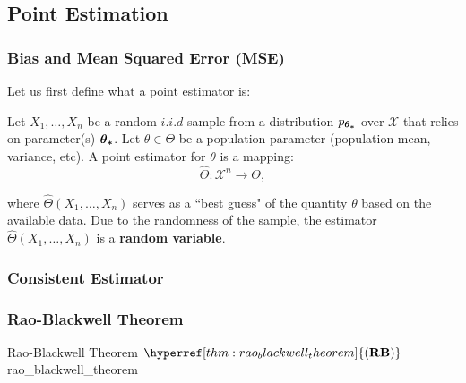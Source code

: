\subsection{Point Estimation}
\newcommand{\RB}{\hyperref[thm:rao_blackwell_theorem]{(\mathrm{{\bf RB}})}}
\newcommand{\CRLB}{\hyperref[thm:cramer_rao_lowerbound]{(\mathrm{{\bf CRLB}})}}

\subsubsection{Bias and Mean Squared Error (MSE)} 
Let us first define what a point estimator is:
\begin{definition}
    Let $X_1, \dots, X_n$ be a random $i.i.d$ sample from a distribution $p_{\boldsymbol{\theta_*}}$ over $\mathcal{X}$ that relies on parameter(s) $\boldsymbol{\theta_*}$. Let $\theta\in\Theta$ be a population parameter (population mean, variance, etc). A point estimator for $\theta$ is a mapping:
    \begin{equation}
        \widehat{\Theta}: \mathcal{X}^n \to \Theta,
    \end{equation}

    \noindent where $\widehat{\Theta}(X_1, \dots, X_n)$ serves as a ``best guess" of the quantity $\theta$ based on the available data. Due to the randomness of the sample, the estimator $\widehat\Theta(X_1, \dots, X_n)$ is a \textbf{random variable}.
\end{definition} 

\subsubsection{Consistent Estimator}


\subsubsection{Rao-Blackwell Theorem}
\begin{theorem}{Rao-Blackwell Theorem $\RB$}{rao_blackwell_theorem}
     
\end{theorem}


